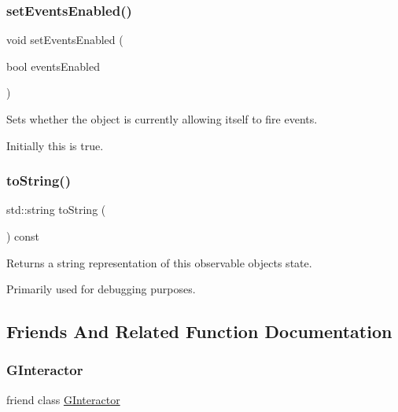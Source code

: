 \subsubsection{\texorpdfstring{set\+Events\+Enabled()}{setEventsEnabled()}}
{\footnotesize\ttfamily void set\+Events\+Enabled (\begin{DoxyParamCaption}\item[{bool}]{events\+Enabled }\end{DoxyParamCaption})\hspace{0.3cm}{\ttfamily [virtual]}}



Sets whether the object is currently allowing itself to fire events. 

Initially this is true. \mbox{\label{classGObservable_a1fe5121d6528fdea3f243321b3fa3a49}} 
\subsubsection{\texorpdfstring{to\+String()}{toString()}}
{\footnotesize\ttfamily std\+::string to\+String (\begin{DoxyParamCaption}{ }\end{DoxyParamCaption}) const\hspace{0.3cm}{\ttfamily [virtual]}}



Returns a string representation of this observable object\textquotesingle{}s state. 

Primarily used for debugging purposes. 

\subsection{Friends And Related Function Documentation}
\mbox{\label{classGObservable_a054e99eaa992da5c1a77c8d7b3817788}} 
\subsubsection{\texorpdfstring{G\+Interactor}{GInteractor}}
{\footnotesize\ttfamily friend class \mbox{\hyperlink{classGInteractor}{G\+Interactor}}\hspace{0.3cm}{\ttfamily [friend]}}

